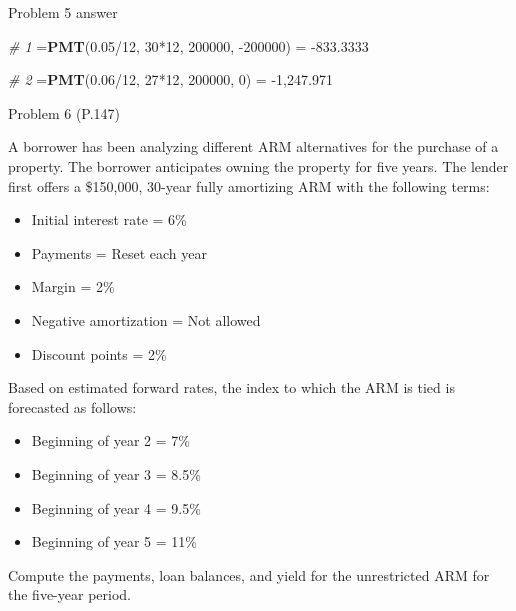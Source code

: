 \documentclass[ignorenonframetext,]{beamer}
\newenvironment{Shaded}{\begin{snugshade}}{\end{snugshade}}
\newcommand{\KeywordTok}[1]{\textcolor[rgb]{0.13,0.29,0.53}{\textbf{{#1}}}}
\newcommand{\DecValTok}[1]{\textcolor[rgb]{0.00,0.00,0.81}{{#1}}}
\newcommand{\FloatTok}[1]{\textcolor[rgb]{0.00,0.00,0.81}{{#1}}}
\newcommand{\StringTok}[1]{\textcolor[rgb]{0.31,0.60,0.02}{{#1}}}
\newcommand{\CommentTok}[1]{\textcolor[rgb]{0.56,0.35,0.01}{\textit{{#1}}}}
\newcommand{\NormalTok}[1]{{#1}}
\providecommand{\tightlist}{%
\setlength{\itemsep}{0pt}\setlength{\parskip}{0pt}}
\begin{document}
\begin{frame}[fragile]{Problem 5 answer}

\begin{Shaded}
\begin{Highlighting}[]
\CommentTok{# 1}
\NormalTok{=}\KeywordTok{PMT}\NormalTok{(}\FloatTok{0.05}\NormalTok{/}\DecValTok{12}\NormalTok{, }\DecValTok{30}\NormalTok{*}\DecValTok{12}\NormalTok{, }\DecValTok{200000}\NormalTok{, -}\DecValTok{200000}\NormalTok{) =}\StringTok{ }\NormalTok{-}\FloatTok{833.3333}

\CommentTok{# 2}
\NormalTok{=}\KeywordTok{PMT}\NormalTok{(}\FloatTok{0.06}\NormalTok{/}\DecValTok{12}\NormalTok{, }\DecValTok{27}\NormalTok{*}\DecValTok{12}\NormalTok{, }\DecValTok{200000}\NormalTok{, }\DecValTok{0}\NormalTok{) =}\StringTok{ }\NormalTok{-}\DecValTok{1}\NormalTok{,}\FloatTok{247.971}
\end{Highlighting}
\end{Shaded}

\normalsize

\end{frame}

\begin{frame}{Problem 6 (P.147)}

\footnotesize

A borrower has been analyzing different ARM alternatives for the
purchase of a property. The borrower anticipates owning the property for
five years. The lender first offers a \$150,000, 30-year fully
amortizing ARM with the following terms:

\begin{itemize}
\tightlist
\item
  Initial interest rate = 6\%
\item
  Payments = Reset each year
\item
  Margin = 2\%
\item
  Negative amortization = Not allowed
\item
  Discount points = 2\%
\end{itemize}

Based on estimated forward rates, the index to which the ARM is tied is
forecasted as follows:

\begin{itemize}
\tightlist
\item
  Beginning of year 2 = 7\%
\item
  Beginning of year 3 = 8.5\%
\item
  Beginning of year 4 = 9.5\%
\item
  Beginning of year 5 = 11\%
\end{itemize}

Compute the payments, loan balances, and yield for the unrestricted ARM
for the five-year period.

\end{frame}
\end{document}
